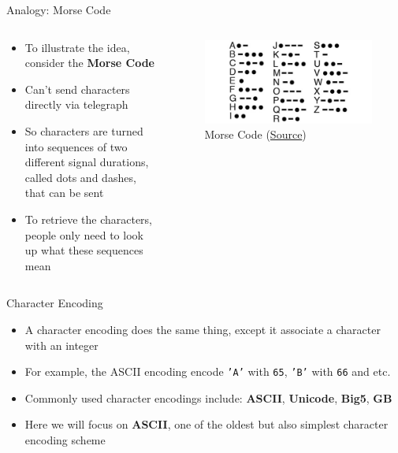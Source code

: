 \documentclass[10pt,xcolor={table,dvipsnames},t]{beamer}
\begin{document}
\begin{frame}[fragile]{Analogy: Morse Code}
  \begin{columns}
    \begin{column}{0.6\textwidth}
      \begin{itemize}
        \item To illustrate the idea, consider the \textbf{Morse Code}
        \item Can't send characters directly via telegraph
        \item So characters are turned into sequences of two different signal durations, called dots and dashes, that can be sent
        \item To retrieve the characters, people only need to look up what these sequences mean
      \end{itemize}
    \end{column}
    \begin{column}{0.4\textwidth}
      \begin{figure}
        \includegraphics[width=\textwidth]{./img/morse-code.jpg}
        \caption{Morse Code (\href{https://www.discoveryworld.org/about/blog/discover_at_home/morse-code/}{Source})}
      \end{figure}
    \end{column}
  \end{columns}
\end{frame}

\begin{frame}[fragile]{Character Encoding}
  \begin{itemize}
    \item A character encoding does the same thing, except it associate a character with an integer
    \item For example, the ASCII encoding encode \texttt{'A'} with \texttt{65}, \texttt{'B'} with \texttt{66} and etc.
    \item Commonly used character encodings include: \textbf{ASCII}, \textbf{Unicode}, \textbf{Big5}, \textbf{GB}
    \item Here we will focus on \textbf{ASCII}, one of the oldest but also simplest character encoding scheme
  \end{itemize}
\end{frame}
\end{document}

